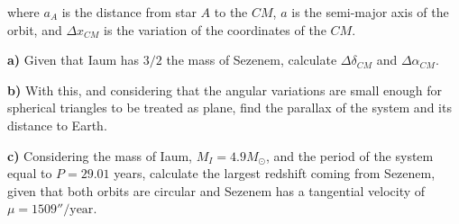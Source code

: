 \documentclass[11pt]{article}
\begin{document}
\begin{pproblem}
    where \(a_A\) is the distance from star \(A\) to the \(CM\), \(a\) is the semi-major axis of the orbit, and \(\Delta x_{CM}\) is the variation of the coordinates of the \(CM\). 
    
    \textbf{a)} Given that Iaum has \(3/2\) the mass of Sezenem, calculate \(\Delta\delta_{CM}\) and \(\Delta\alpha_{CM}\).
    
    \textbf{b)} With this, and considering that the angular variations are small enough for spherical triangles to be treated as plane, find the parallax of the system and its distance to Earth.

    \textbf{c)} Considering the mass of Iaum, \(M_I = 4.9 M_\odot\), and the period of the system equal to \(P = 29.01\) years, calculate the largest redshift coming from Sezenem, given that both orbits are circular and Sezenem has a tangential velocity of \(\mu = 1509''/\text{year}\).

\end{pproblem}
\end{document}
